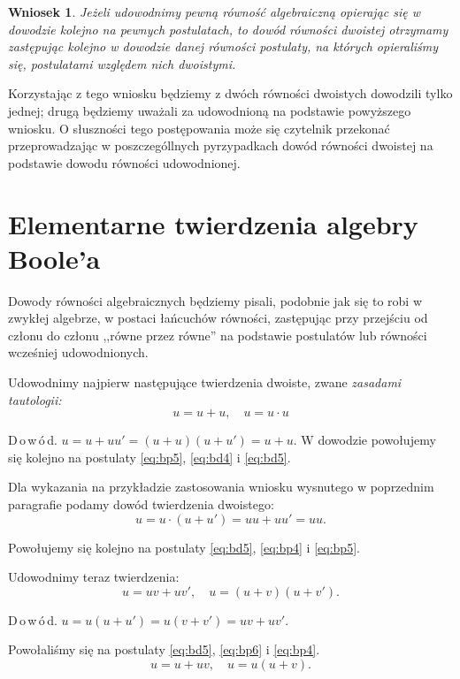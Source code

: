 \documentclass[12 pt, a4paper, leqno]{book}
\numberwithin{equation}{section}
\newcommand{\dowod}{D\,o\,w\,ó\,d}
\theoremstyle{twr}
\theoremstyle{twr}
\newtheorem*{wniosek}{Wniosek}
\theoremstyle{eqtext}
\theoremstyle{okreslenie}
\begin{document}
\begin{wniosek}
Jeżeli udowodnimy pewną równość algebraiczną opierając się w dowodzie kolejno na pewnych postulatach, to dowód równości dwoistej
otrzymamy zastępując kolejno w dowodzie danej równości postulaty, na których opieraliśmy się, postulatami względem nich dwoistymi.
\end{wniosek}

Korzystając z tego wniosku będziemy z dwóch równości dwoistych dowodzili tylko jednej; drugą będziemy uważali za udowodnioną na podstawie powyższego wniosku.
O słuszności tego postępowania może się czytelnik przekonać przeprowadzając w poszczególlnych pyrzypadkach dowód równości dwoistej na podstawie dowodu równości
udowodnionej.

\section{Elementarne twierdzenia algebry Boole'a} \label{sec:elementarne}
Dowody równości algebraicznych będziemy pisali, podobnie jak się to robi w zwykłej algebrze, w postaci łańcuchów równości, zastępując przy przejściu
od członu do członu ,,równe przez równe'' na podstawie postulatów lub równości wcześniej udowodnionych.

Udowodnimy najpierw następujące twierdzenia dwoiste, zwane \textit{zasadami tautologii:}
\begin{equation} \label{eq:taut}
u = u + u, \quad u = u \cdot u
\end{equation}

\dowod. $u = u + uu' = (u + u)(u+u') = u + u.$ W dowodzie powołujemy się kolejno na postulaty \eqref{eq:bp5}, \eqref{eq:bd4} i \eqref{eq:bd5}.

Dla wykazania na przykładzie zastosowania wniosku wysnutego w poprzednim paragrafie podamy dowód twierdzenia dwoistego:
\begin{displaymath}
u = u \cdot (u + u') = uu + uu' = uu.
\end{displaymath}

Powołujemy się kolejno na postulaty \eqref{eq:bd5}, \eqref{eq:bp4} i \eqref{eq:bp5}.

Udowodnimy teraz twierdzenia:
\begin{equation} \label{eq:sumailoczynow}
u = uv + uv', \quad u = (u + v)(u + v').
\end{equation}

\dowod. $u = u(u + u') = u(v + v') = uv + uv'.$

Powołaliśmy się na postulaty \eqref{eq:bd5}, \eqref{eq:bp6} i \eqref{eq:bp4}.
\begin{equation} \label{eq:absorpcja}
u = u + uv, \quad u = u(u + v).
\end{equation}
\end{document}

